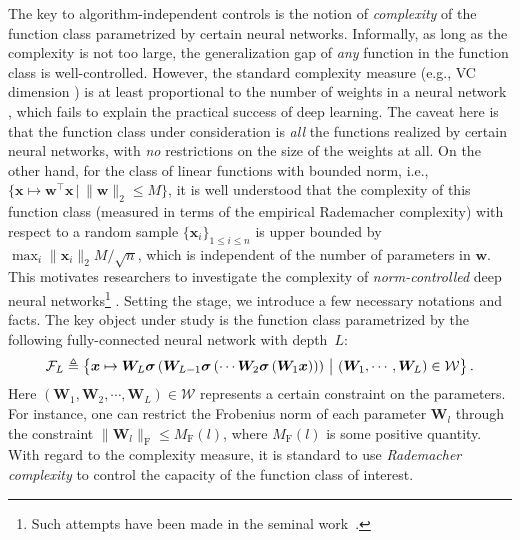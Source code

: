 The key to algorithm-independent controls is the notion of \emph{complexity
}of the function class parametrized by certain neural networks. Informally,
as long as the complexity is not too large, the generalization gap
of \emph{any} function in the function class is well-controlled. However,
the standard complexity measure (e.g., VC dimension \citep{vapnik1971uniform})
is at least proportional to the number of weights
in a neural network \citep{anthony2009neural, shalev2014understanding}, which fails to
explain the practical success of deep learning. The caveat here is
that the function class under consideration is \emph{all} the functions realized
by certain neural networks, with \emph{no} restrictions on the size
of the weights at all. On the other hand, for the class of linear
functions with bounded norm, i.e., $\{\bm{x}\mapsto\bm{w}^{\top}\bm{x}\,|\,\|\bm{w}\|_{2}\leq M\}$,
it is well understood that the complexity of
this function class (measured in terms of the empirical Rademacher complexity) with respect to a random sample $\{\bm{x}_{i}\}_{1 \leq i \leq n}$
is upper bounded by $\max_{i}\|\bm{x}_{i}\|_{2}M/\sqrt{n}$, which
is independent of the number of parameters in $\bm{w}$. This motivates
researchers to investigate the complexity of \emph{norm-controlled}
deep neural networks\footnote{Such attempts have been made in the seminal work~\cite{bartlett1998sample}.} \citep{neyshabur2015norm,NIPS2017_7204,golowich2017size,li2018tighter}.
Setting the stage, we introduce a few necessary notations and facts.
The key object under study is the function class parametrized by the
following fully-connected neural network with depth~$L$:
\begin{equation}
\mathcal{F}_{L}\triangleq\left\{ \bm{x}\mapsto\bm{W}_{L}\bm{\sigma}\left(\bm{W}_{L-1}\bm{\sigma}\left(\cdots\bm{W}_{2}\bm{\sigma}\left(\bm{W}_{1}\bm{x}\right)\right)\right)\,\big|\,\left(\bm{W}_{1},\cdots,\bm{W}_{L}\right)\in\mathcal{W}\right\}.\label{eq:function-class-ffn}
\end{equation}
Here $(\bm{W}_{1},\bm{W}_{2},\cdots,\bm{W}_{L})\in\mathcal{W}$
represents a certain constraint on the parameters. For instance, one
can restrict the Frobenius norm of each parameter $\bm{W}_{l}$ through
the constraint $\|\bm{W}_{l}\|_{\mathrm{F}}\leq M_{\mathrm{F}}(l)$,
where $M_{\mathrm{F}}(l)$ is some positive quantity. With regard
to the complexity measure, it is standard to use \emph{Rademacher
complexity} to control the capacity of the function class of interest.

